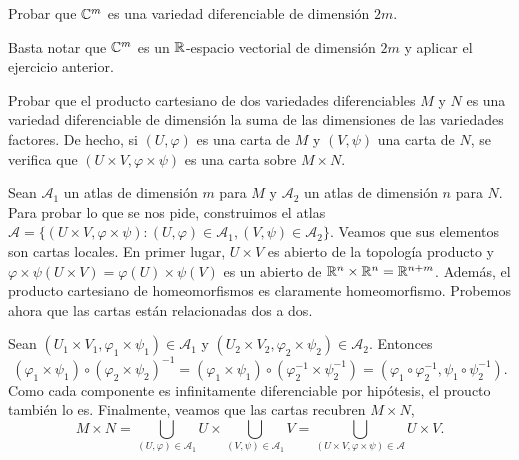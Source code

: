 \documentclass[twoside]{article}
\begin{document}
\begin{ejercicio}{6}
Probar que $\mathbb{C}^m$ es una variedad diferenciable de dimensión $2m$.
\end{ejercicio}
\begin{solucion}
Basta notar que $\mathbb{C}^m$ es un $\mathbb{R}$-espacio vectorial de dimensión $2m$ y aplicar el ejercicio anterior.
\end{solucion}

\begin{ejercicio}{7}
Probar que el producto cartesiano de dos variedades diferenciables $M$ y $N$
es una variedad diferenciable de dimensión la suma de las dimensiones de
las variedades factores. De hecho, si $(U,\varphi)$ es una carta de $M$ y $(V,\psi )$ una
carta de $N$, se verifica que $(U \times V,\varphi\times\psi )$ es una carta sobre $M \times N$.
\end{ejercicio}
\begin{solucion}
Sean $\mathcal{A}_1$ un atlas de dimensión $m$ para $M$ y $\mathcal{A}_2$ un atlas de dimensión $n$ para $N$. Para probar lo que se nos pide, construimos el atlas $\mathcal{A}=\{(U\times V,\varphi\times\psi): (U,\varphi)\in\mathcal{A}_1, (V,\psi)\in\mathcal{A}_2\}$. Veamos que sus elementos son cartas locales. En primer lugar, $U\times V$ es abierto de la topología producto y $\varphi\times\psi(U\times V)=\varphi(U)\times\psi(V)$ es un abierto de $\mathbb{R}^n\times\mathbb{R}^n=\mathbb{R}^{n+m}$. Además, el producto cartesiano de homeomorfismos es claramente homeomorfismo. Probemos ahora que las cartas están relacionadas dos a dos. 

Sean $(U_1\times V_1,\varphi_1\times\psi_1)\in\mathcal{A}_1$ y $(U_2\times V_2,\varphi_2\times\psi_2)\in\mathcal{A}_2$. Entonces 
$$(\varphi_1\times\psi_1)\circ(\varphi_2\times\psi_2)^{-1}=(\varphi_1\times\psi_1)\circ(\varphi_2^{-1}\times\psi_2^{-1})=(\varphi_1\circ\varphi_2^{-1},\psi_1\circ\psi_2^{-1}).$$
Como cada componente es infinitamente diferenciable por hipótesis, el proucto también lo es. Finalmente, veamos que las cartas recubren $M\times N$,
$$M\times N= \bigcup_{(U,\varphi)\in\mathcal{A}_1}U\times\bigcup_{(V,\psi)\in\mathcal{A}_1}V=\bigcup_{(U\times V,\varphi\times\psi)\in\mathcal{A}}U\times V.$$
\end{solucion}
\end{document}
